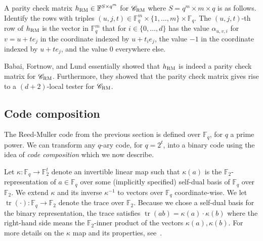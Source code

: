 \documentclass[11pt]{article}
\newtheorem{theorem}{Theorem}[section]
\theoremstyle{definition}
\newcommand{\code}{\mathscr{C}}
\newcommand{\F}{\ensuremath{\mathbb{F}}}
\newcommand{\mX}{\ensuremath{\mathcal{X}}}
\newcommand{\RM}{\ensuremath{\textsc{RM}}}
\DeclareMathOperator{\poly}{poly}
\newcommand{\eps}{\varepsilon}
\DeclareMathOperator{\tr}{tr}
\begin{document}
A parity check matrix $h_{\RM} \in \F^{S \times q^m}$ for $\code_{\RM}$ where $S = q^m \times m \times q$ is as follows. Identify the rows with triples $(u,j,t) \in \F_q^m \times \{1,\ldots,m\} \times \F_q$. The $(u,j,t)$-th row of $h_{\RM}$ is the vector in $\F_q^m$ that for $i \in \{0,\ldots,d\}$ has the value $\alpha_{u,v,i}$ for $v = u + t e_j$ in the coordinate indexed by $u + t_i e_j$, the value $-1$ in the coordinate indexed by $u + te_j$, and the value $0$ everywhere else. 

Babai, Fortnow, and Lund essentially showed that  $h_{\RM}$ is indeed a parity check matrix for $\code_{\RM}$.  Furthermore, they showed that the parity check matrix gives rise to a $(d+2)$-local tester for $\code_{\RM}$. 




\subsection{Code composition}
\label{sec:code-comp}

 The Reed-Muller code from the previous section is defined over $\F_q$, for $q$ a prime power. We can transform any $q$-ary code, for $q=2^t$, into a binary code using the idea of \emph{code composition} which we now describe. 


Let $\kappa: \F_q \to \F_2^t$ denote an invertible linear map such that $\kappa(a)$ is the $\F_2$-representation of $a \in \F_q$ over some (implicitly specified) self-dual basis of $\F_q$ over $\F_2$. We extend $\kappa$ and its inverse $\kappa^{-1}$ to vectors over $\F_q$ coordinate-wise. We let $\tr(\cdot):\F_q\to\F_2$ denote the trace over $\F_2$. Because we chose a self-dual basis for the binary representation, the trace satisfies $\tr(ab)=\kappa(a)\cdot\kappa(b)$  where the right-hand side means the $\F_2$-inner product of the vectors $\kappa(a), \kappa(b)$. For more details on the $\kappa$ map and its properties, see~\cite[Section 3.3]{ji2020mip}.
\end{document}
